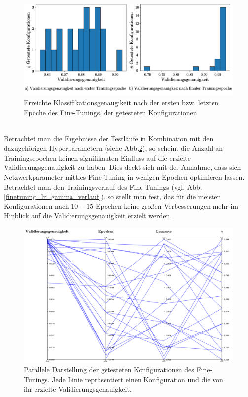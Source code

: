 \begin{figure}[h]
\includegraphics[scale=0.750]{NNOPT/init_and_end_perf_finetuning.pdf}
\caption{Erreichte Klassifikationsgenaugikeit nach der ersten bzw. letzten Epoche des Fine-Tunings, der getesteten Konfigurationen}
\label{finetuning_int_end}
\end{figure}
\\
Betrachtet man die Ergebnisse der Testläufe in Kombination mit den dazugehörigen Hyperparametern (siehe Abb.\ref{finetuning_all}), so scheint die Anzahl an Trainingsepochen keinen signifikanten Einfluss auf die erzielte Validierungsgenauigkeit zu haben. Dies deckt sich mit der Annahme, dass sich Netzwerkparameter mittles Fine-Tuning in wenigen Epochen optimieren lassen. Betrachtet man den Trainingsverlauf des Fine-Tunings (vgl. Abb. \ref{finetuning_lr_gamma_verlauf}), so stellt man fest, das für die meisten Konfigurationen nach $10-15$ Epochen keine großen Verbesserungen mehr im Hinblick auf die Validierungsgenauigkeit erzielt werden.  
\begin{figure}[h]
\includegraphics[scale=0.6]{NNOPT/finetuning_all.pdf}
\caption{Parallele Darstellung der getesteten Konfigurationen des Fine-Tunings. Jede Linie repräsentiert einen Konfiguration und die von ihr erzielte Validierungsgenauigkeit.}
\label{finetuning_all}
\end{figure}
